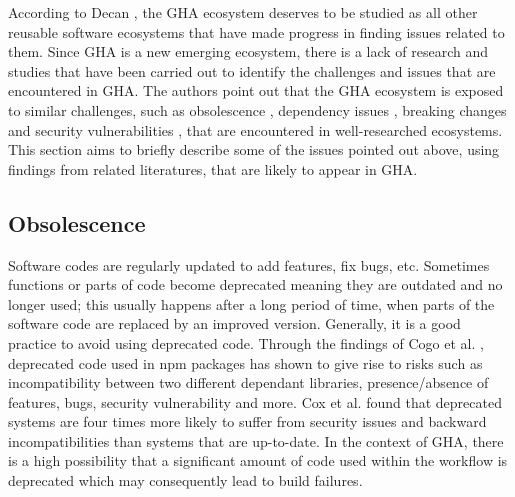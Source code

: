 \documentclass[conference]{IEEEtran}
\begin{document}
    According to Decan \cite{decan2022use}, the GHA ecosystem deserves to be studied as all other reusable software ecosystems that have made progress in finding issues related to them. Since GHA is a new emerging ecosystem, there is a lack of research and studies that have been carried out to identify the challenges and issues that are encountered in GHA. The authors point out that the GHA ecosystem is exposed to similar challenges, such as obsolescence \cite{decan2018evolution} \cite{cogo2021deprecation}, dependency issues \cite{decan2019empirical} \cite{soto2021comprehensive} \cite{decan2019package}, breaking changes \cite{dietrich2019dependency}\cite{decan2018impact} and security vulnerabilities \cite{zimmermann2019small} \cite{kula2018developers}, that are encountered in well-researched ecosystems. This section aims to briefly describe some of the issues pointed out above, using findings from related literatures, that are likely to appear in GHA.

    \subsection{Obsolescence}
        Software codes are regularly updated to add features, fix bugs, etc. Sometimes functions or parts of code become deprecated meaning they are outdated and no longer used; this usually happens after a long period of time, when parts of the software code are replaced by an improved version. Generally, it is a good practice to avoid using deprecated code. Through the findings of Cogo et al. \cite{cogo2021deprecation}, deprecated code used in npm packages has shown to give rise to risks such as incompatibility between two different dependant libraries, presence/absence of features, bugs, security vulnerability and more. Cox et al. \cite{cox2015measuring} found that deprecated systems are four times more likely to suffer from security issues and backward incompatibilities than systems that are up-to-date. In the context of GHA, there is a high possibility that a significant amount of code used within the workflow is deprecated which may consequently lead to build failures.
\end{document}
